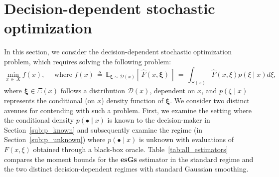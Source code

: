 \documentclass[11pt,reqno]{amsart}
\newcommand{\1}{{\bf 1}}
\newcommand{\2}{{\bf 2}}
\newcommand{\bxi}{\boldsymbol{\xi}}
\numberwithin{equation}{section}
\theoremstyle{remark}
\begin{document}
{			
			
			\section{Decision-dependent stochastic optimization}\label{sec:Decision_Dep}
			In this section, we consider the decision-dependent stochastic optimization problem, which requires solving the following problem:
			\begin{equation}\label{eq:DDproblem}
				\min_{x \, \in \, X} f(x), \quad \mbox{ where } f(x) \, \triangleq  \, \mathbb{E}_{\bxi \sim \mathcal{D}(x)} \left[\, \hat{F}(x, \bxi)\, \right] \, = \, \int_{\Xi(x)} \hat{F}(x, \xi)p(\xi \mid  x) d\xi,
			\end{equation}
			where $\bxi \in \Xi(x)$ follows a distribution $\mathcal{D}(x)$, dependent on $x$, and $p(\xi \mid x)$ represents the conditional (on $x$) density function of $\bxi$. We consider two distinct avenues for contending with such a problem. First, we examine the setting where the conditional density $p(\bullet \mid x)$ is known to the decision-maker in Section~\ref{sub:p_known} and subsequently examine the regime (in Section~\ref{sub:p_unknown}) where $p(\bullet\mid x)$ is unknown with evaluations of $F(x,\xi)$ obtained through a black-box oracle. Table~\ref{tab:all_estimators} {compares} the moment bounds for the {\bf esGs} estimator in the standard regime {and the two distinct} decision-dependent regimes {with standard Gaussian smoothing.}
			
}
\end{document}
